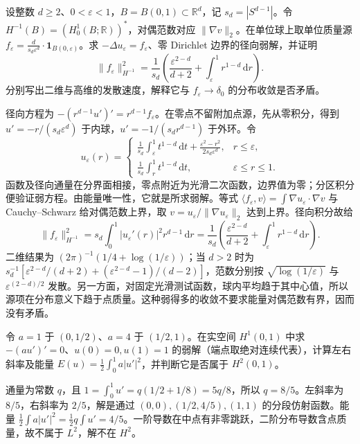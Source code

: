 \begin{exercise}\label{b2:ex:15-high-dimensional-point}
设整数 \(d\ge2\)、\(0<\varepsilon<1\)，\(B=B(0,1)\subset\mathbb R^d\)，记 \(s_d=|S^{d-1}|\)。令 \(H^{-1}(B)=(H_0^1(B;\mathbb R))^*\)，对偶范数对应 \(\|\nabla v\|_2\)。在单位球上取单位质量源
\(f_\varepsilon=\frac{d}{s_d\varepsilon^d}\cdot\mathbf1_{B(0,\varepsilon)}\)。求 \(-\Delta u_\varepsilon=f_\varepsilon\)、零 Dirichlet 边界的径向弱解，并证明
\[
 \|f_\varepsilon\|_{H^{-1}}^2
 =\frac1{s_d}\left(\frac{\varepsilon^{2-d}}{d+2}
                  +\int_\varepsilon^1r^{1-d}\,\mathrm dr\right).
\]
分别写出二维与高维的发散速度，解释它与 \(f_\varepsilon\to\delta_0\) 的分布收敛是否矛盾。
\end{exercise}
\begin{solution}
径向方程为 \(-(r^{d-1}u')'=r^{d-1}f_\varepsilon\)。在零点不留附加点源，先从零积分，得到 \(u'=-r/(s_d\varepsilon^d)\) 于内球，\(u'=-1/(s_dr^{d-1})\) 于外环。令
\[
 u_\varepsilon(r)=
 \begin{cases}
 \displaystyle\frac1{s_d}\int_\varepsilon^1t^{1-d}\,\mathrm dt
            +\frac{\varepsilon^2-r^2}{2s_d\varepsilon^d},&r\leq\varepsilon,\\[3pt]
 \displaystyle\frac1{s_d}\int_r^1t^{1-d}\,\mathrm dt,&\varepsilon\leq r\leq1.
 \end{cases}
\]
函数及径向通量在分界面相接，零点附近为光滑二次函数，边界值为零；分区积分便验证弱方程。由能量唯一性，它就是所求弱解。等式 \(\langle f_\varepsilon,v\rangle=\int\nabla u_\varepsilon\cdot\nabla v\) 与 Cauchy--Schwarz 给对偶范数上界，取 \(v=u_\varepsilon/\|\nabla u_\varepsilon\|_2\) 达到上界。径向积分故给
\[
 \|f_\varepsilon\|_{H^{-1}}^2
 =s_d\int_0^1|u_\varepsilon'(r)|^2r^{d-1}\,\mathrm dr
 =\frac1{s_d}\left(\frac{\varepsilon^{2-d}}{d+2}
                  +\int_\varepsilon^1r^{1-d}\,\mathrm dr\right).
\]
二维结果为 \((2\pi)^{-1}(1/4+\log(1/\varepsilon))\)；当 \(d>2\) 时为
\(s_d^{-1}[\varepsilon^{2-d}/(d+2)+(\varepsilon^{2-d}-1)/(d-2)]\)，范数分别按 \(\sqrt{\log(1/\varepsilon)}\) 与 \(\varepsilon^{(2-d)/2}\) 发散。另一方面，对固定光滑测试函数，球内平均趋于其中心值，所以源项在分布意义下趋于点质量。这种弱得多的收敛不要求能量对偶范数有界，因而没有矛盾。
\end{solution}

\begin{exercise}\label{b2:ex:15-layered-material}
令 \(a=1\) 于 \((0,1/2)\)、\(a=4\) 于 \((1/2,1)\)。在实空间 \(H^1(0,1)\) 中求 \(-(au')'=0\)、\(u(0)=0,u(1)=1\) 的弱解（端点取绝对连续代表），计算左右斜率及能量 \(E(u)=\frac12\int_0^1a|u'|^2\)，并判断它是否属于 \(H^2(0,1)\)。
\end{exercise}
\begin{solution}
通量为常数 \(q\)，且 \(1=\int_0^1u'=q(1/2+1/8)=5q/8\)，所以 \(q=8/5\)。左斜率为 \(8/5\)，右斜率为 \(2/5\)，解是通过 \((0,0),(1/2,4/5),(1,1)\) 的分段仿射函数。能量 \(\tfrac12\int a|u'|^2=\tfrac12q\int u'=4/5\)。一阶导数在中点有非零跳跃，二阶分布导数含点质量，故不属于 \(L^2\)，解不在 \(H^2\)。
\end{solution}

